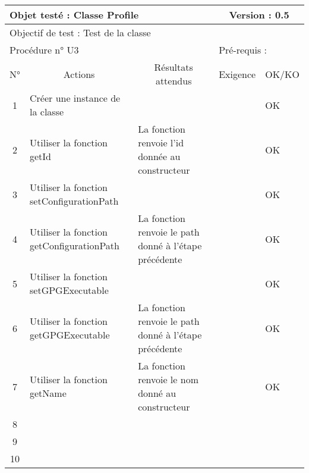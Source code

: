 \documentclass{../res/univ-projet}
\begin{document}
\begin{center}
    \begin{tabular}{|c|p{5cm}|p{5cm}|p{1.5cm}|p{1.5cm}|}
      \hline
      \multicolumn{3}{|l|}{Objet testé : Classe Profile} & \multicolumn{2}{c|}{Version : 0.5}\\ \hline
      \multicolumn{5}{|l|}{Objectif de test : Test de la classe}\\ \hline
      \multicolumn{3}{|l|}{Procédure n° U3} & \multicolumn{2}{p{3cm}|}{Pré-requis : }\\ \hline
      \multicolumn{1}{|c|}{N°} & \multicolumn{1}{c|}{Actions} & \multicolumn{1}{c|}{Résultats attendus} & 
      \multicolumn{1}{c|}{Exigence} & \multicolumn{1}{c|}{OK/KO}\\ \hline
      1 & Créer une instance de la classe &  &  & OK \\
      2 & Utiliser la fonction getId & La fonction renvoie l'id donnée au constructeur &  & OK \\
      3 & Utiliser la fonction setConfigurationPath &  &  & OK \\
      4 & Utiliser la fonction getConfigurationPath & La fonction renvoie le path donné à l'étape précédente &  & OK \\
      5 & Utiliser la fonction setGPGExecutable &  &  & OK \\
      6 & Utiliser la fonction getGPGExecutable & La fonction renvoie le path donné à l'étape précédente &  & OK \\
      7 & Utiliser la fonction getName & La fonction renvoie le nom donné au constructeur &  & OK \\
      8 &  &  &  &  \\
      9 &  &  &  & \\
      10 &  &  &  &\\ 
  \hline
    \end{tabular}
    \vskip 2.2cm
    

\end{center}
\end{document}
